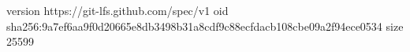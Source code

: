 version https://git-lfs.github.com/spec/v1
oid sha256:9a7ef6aa9f0d20665e8db3498b31a8cdf9c88ecfdacb108cbe09a2f94ece0534
size 25599
